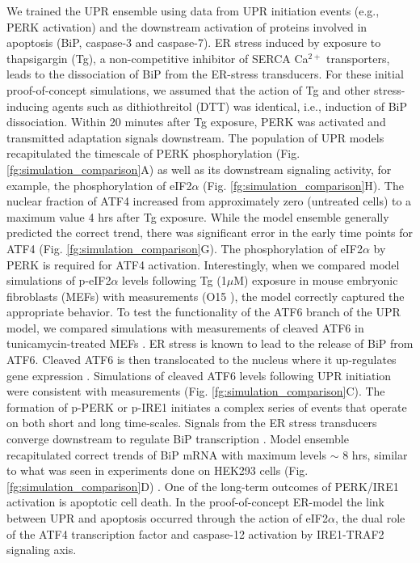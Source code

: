 \documentclass[fleqn,10pt]{wlscirep}
\begin{document}
We trained the UPR ensemble using data from UPR initiation events (e.g., PERK activation) and the downstream activation of proteins involved in apoptosis (BiP, caspase-3 and caspase-7).
ER stress induced by exposure to thapsigargin (Tg), a non-competitive inhibitor of SERCA Ca$^{2+}$ transporters, leads to the dissociation of BiP from the ER-stress transducers.
For these initial proof-of-concept simulations, we assumed that the action of Tg and other stress-inducing agents such as dithiothreitol (DTT) was identical, i.e., induction of BiP dissociation.
Within 20 minutes after Tg exposure, PERK was activated and transmitted adaptation signals downstream.
The population of UPR models recapitulated the timescale of PERK phosphorylation (Fig. \ref{fg:simulation_comparison}A) as well as its downstream signaling activity, for example, the phosphorylation of eIF2$\alpha$ (Fig. \ref{fg:simulation_comparison}H).
The nuclear fraction of ATF4 increased from approximately zero (untreated cells) to a maximum value 4 hrs after Tg exposure.
While the model ensemble generally predicted the correct trend, there was significant error in the early time points for ATF4 (Fig. \ref{fg:simulation_comparison}G).
The phosphorylation of eIF2$\alpha$ by PERK is required for ATF4 activation. Interestingly, when we compared model simulations of p-eIF2$\alpha$ levels following Tg (1$\mu$M) exposure in mouse embryonic fibroblasts (MEFs) with measurements (O15 \cite{yamamoto2007tim}), the model correctly captured the appropriate behavior.
To test the functionality of the ATF6 branch of the UPR model, we compared simulations with measurements of cleaved ATF6 in tunicamycin-treated MEFs \cite{lee2002imu}.
ER stress is known to lead to the release of BiP from ATF6.
Cleaved ATF6 is then translocated to the nucleus where it up-regulates gene expression \cite{silver1999mtf,hai1989tfa}.
Simulations of cleaved ATF6 levels following UPR initiation were consistent with measurements (Fig. \ref{fg:simulation_comparison}C).
The formation of p-PERK or p-IRE1 initiates a complex series of events that operate on both short and long time-scales.
Signals from the ER stress transducers converge downstream to regulate BiP transcription \cite{malhotra2007era, rao2004mpe,kokame2001iei, yoshida2000aap}.
Model ensemble recapitulated correct trends of BiP mRNA with maximum levels $\sim$ 8 hrs, similar to what was seen in experiments done on HEK293 cells (Fig. \ref{fg:simulation_comparison}D) \cite{lin2007ire1}.
One of the long-term outcomes of PERK/IRE1 activation is apoptotic cell death. In the proof-of-concept ER-model the link between UPR and apoptosis occurred through the action of eIF2$\alpha$, the dual role of the ATF4 transcription factor and caspase-12 activation by IRE1-TRAF2 signaling axis.
\end{document}
